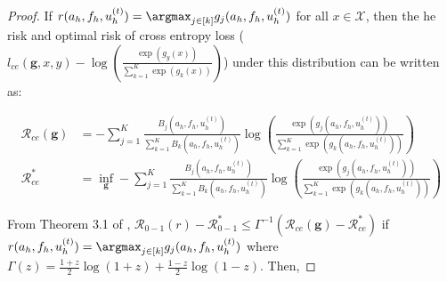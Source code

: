 \documentclass{article}
\begin{document}
\begin{proof}
If $r(a_h, f_h, u^{(t)}_h) = \argmax_{j \in [k]} g_j(a_h, f_h, u^{(t)}_h)$ for all $x \in \mathcal{X}$, then the he risk and optimal risk of cross entropy loss ($l_{ce}(\mathbf{g}, x, y)-\log\left(\frac{\exp\left(g_y(x)\right)}{\sum_{k = 1}^K\exp\left(g_k(x)\right)}\right)$) under this distribution can be written as:

\begin{align*}
    \mathcal{R}_{ce}(\mathbf{g}) &= -\sum_{j = 1}^K \frac{B_j(a_h, f_h, u^{(t)}_h)}{\sum_{k = 1}^K B_k(a_h, f_h, u^{(t)}_h)}\log\left(\frac{\exp\left(g_j(a_h, f_h, u^{(t)}_h)\right)}{\sum_{k = 1}^K\exp\left(g_k(a_h, f_h, u^{(t)}_h)\right)}\right) \\
    \mathcal{R}_{ce}^* &= \inf_{\mathbf{g}} -\sum_{j = 1}^K \frac{B_j(a_h, f_h, u^{(t)}_h)}{\sum_{k = 1}^K B_k(a_h, f_h, u^{(t)}_h)}\log\left(\frac{\exp\left(g_j(a_h, f_h, u^{(t)}_h)\right)}{\sum_{k = 1}^K\exp\left(g_k(a_h, f_h, u^{(t)}_h)\right)}\right) 
\end{align*}

From Theorem 3.1 of \citep{mao2023cross}, $\mathcal{R}_{0-1}(r) - \mathcal{R}_{0-1}^* \leq \Gamma^{-1}\left(\mathcal{R}_{ce}(\mathbf{g}) - \mathcal{R}_{ce}^*\right)$ if $r(a_h, f_h, u^{(t)}_h) = \argmax_{j \in [k]} g_j(a_h, f_h, u^{(t)}_h)$ where $\Gamma(z) = \frac{1 + z}{2}\log(1 + z) + \frac{1 - z}{2}\log(1 - z)$. Then,


\end{proof}
\end{document}
